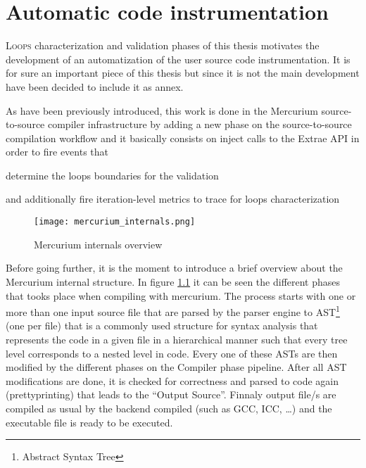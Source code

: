 \chapter{Automatic code instrumentation}\label{ann:automatic_code_instr}

\lettrine{L}{oops} characterization and validation phases of this thesis motivates the development
of an automatization of the user source code instrumentation. It is for sure an
important piece of this thesis but since it is not the main development have been
decided to include it as annex.

As have been previously introduced, this work is done in the Mercurium 
source-to-source compiler infrastructure by adding a new phase on the 
source-to-source compilation workflow and it basically consists on inject 
calls to the Extrae API in order to fire events that
\begin{enumerate*}[label=\roman*)]
    \item determine the loops boundaries for the validation
    \item and additionally fire iteration-level metrics to trace for loops characterization
\end{enumerate*}

\begin{figure}
  \centering
  \texttt{[image: mercurium\_internals.png]}
  \caption{Mercurium internals overview}
  \label{fig:mercurium_internals_overview}
\end{figure}

Before going further, it is the moment to introduce a brief overview about the
Mercurium internal structure. In figure \ref{fig:mercurium_internals_overview} 
it can be seen the different phases that tooks place when compiling with
mercurium. The process starts with one or more than one input source file that
are parsed by the parser engine to AST\footnote{Abstract Syntax Tree} (one per
file) that is a commonly used structure for syntax analysis that represents the 
code in a given file in a hierarchical manner such that every tree level
corresponds to a nested level in code. Every one of these ASTs are then modified
by the different phases on the Compiler phase pipeline. 
After all AST modifications are done, it is checked for
correctness and parsed to code again (prettyprinting) that leads to the ``Output
Source''. Finnaly output file/s are compiled as usual by the backend compiled
(such as GCC, ICC, \ldots) and the executable file is ready to be executed.

